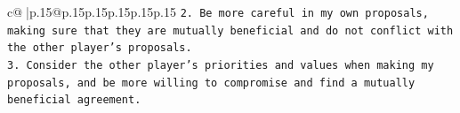 \documentclass{article}
\begin{document}
{\begin{supertabular}{c@{$\;$}|p{.15\linewidth}@{}p{.15\linewidth}p{.15\linewidth}p{.15\linewidth}p{.15\linewidth}p{.15\linewidth}}
{{{\texttt{2. Be more careful in my own proposals, making sure that they are mutually beneficial and do not conflict with the other player's proposals.} \\
\texttt{3. Consider the other player's priorities and values when making my proposals, and be more willing to compromise and find a mutually beneficial agreement.} \\
            }
        }
    }
     \\ \\

\end{supertabular}
}
\end{document}
